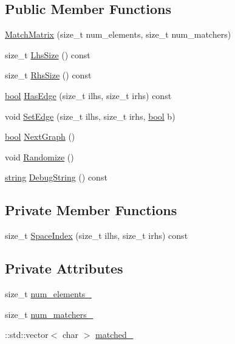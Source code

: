 \subsection*{Public Member Functions}
\begin{DoxyCompactItemize}
\item 
\hyperlink{classtesting_1_1internal_1_1MatchMatrix_afa3313976a69b2a954b2f8b8840c37bb}{Match\+Matrix} (size\+\_\+t num\+\_\+elements, size\+\_\+t num\+\_\+matchers)
\item 
size\+\_\+t \hyperlink{classtesting_1_1internal_1_1MatchMatrix_a337d9793c61d985dbc1be166e34eed61}{Lhs\+Size} () const
\item 
size\+\_\+t \hyperlink{classtesting_1_1internal_1_1MatchMatrix_aff068e9fed3a42466c5da8766ac43134}{Rhs\+Size} () const
\item 
\hyperlink{classbool}{bool} \hyperlink{classtesting_1_1internal_1_1MatchMatrix_a94c7641a932739734cb2207b1bca4036}{Has\+Edge} (size\+\_\+t ilhs, size\+\_\+t irhs) const
\item 
void \hyperlink{classtesting_1_1internal_1_1MatchMatrix_aac7e9c6e0e4b51e6b1334829a0781021}{Set\+Edge} (size\+\_\+t ilhs, size\+\_\+t irhs, \hyperlink{classbool}{bool} b)
\item 
\hyperlink{classbool}{bool} \hyperlink{classtesting_1_1internal_1_1MatchMatrix_a3a35e2d6107c225537d7e776465a7893}{Next\+Graph} ()
\item 
void \hyperlink{classtesting_1_1internal_1_1MatchMatrix_aff1f0ae748f4a5c96117c0f27b493ac6}{Randomize} ()
\item 
\hyperlink{namespacetesting_1_1internal_a8e8ff5b11e64078831112677156cb111}{string} \hyperlink{classtesting_1_1internal_1_1MatchMatrix_a9dc07616205c58e2747dead0a14467b2}{Debug\+String} () const
\end{DoxyCompactItemize}
\subsection*{Private Member Functions}
\begin{DoxyCompactItemize}
\item 
size\+\_\+t \hyperlink{classtesting_1_1internal_1_1MatchMatrix_aa5c4d081304a4923df078bd153c735e4}{Space\+Index} (size\+\_\+t ilhs, size\+\_\+t irhs) const
\end{DoxyCompactItemize}
\subsection*{Private Attributes}
\begin{DoxyCompactItemize}
\item 
size\+\_\+t \hyperlink{classtesting_1_1internal_1_1MatchMatrix_a9e4eb268fa140a516390631cddc681db}{num\+\_\+elements\+\_\+}
\item 
size\+\_\+t \hyperlink{classtesting_1_1internal_1_1MatchMatrix_aa89a05c387a88844fd30f03d1a24ce35}{num\+\_\+matchers\+\_\+}
\item 
\+::std\+::vector$<$ char $>$ \hyperlink{classtesting_1_1internal_1_1MatchMatrix_ae01ec0d94b7812559acfcf84f10707e2}{matched\+\_\+}
\end{DoxyCompactItemize}


